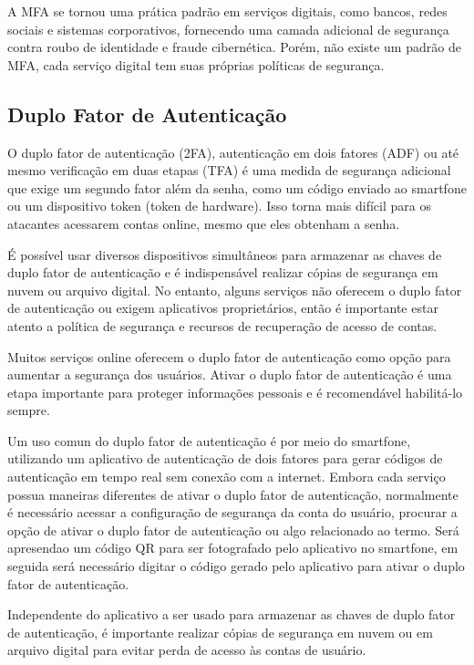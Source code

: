 \documentclass[12pt]{article}
\begin{document}
A MFA se tornou uma prática padrão em serviços digitais, como bancos,
redes sociais e sistemas corporativos, fornecendo uma camada adicional
de segurança contra roubo de identidade e fraude cibernética.
Porém, não existe um padrão de MFA, cada serviço digital tem suas
próprias políticas de segurança.

\subsection{Duplo Fator de Autenticação}

O duplo fator de autenticação (2FA), autenticação em dois fatores (ADF) ou
até mesmo verificação em duas etapas (TFA) é uma medida de segurança
adicional que exige um segundo fator além da senha, como um código enviado
ao smartfone ou um dispositivo token (token de hardware).
Isso torna mais difícil para os atacantes acessarem contas online, mesmo
que eles obtenham a senha.

É possível usar diversos dispositivos simultâneos para armazenar as chaves
de duplo fator de autenticação e é indispensável realizar cópias de
segurança em nuvem ou arquivo digital.
No entanto, alguns serviços não oferecem o duplo fator de autenticação ou
exigem aplicativos proprietários, então é importante estar atento a
política de segurança e recursos de recuperação de acesso de contas.

Muitos serviços online oferecem o duplo fator de autenticação como opção
para aumentar a segurança dos usuários.
Ativar o duplo fator de autenticação é uma etapa importante para proteger
informações pessoais e é recomendável habilitá-lo sempre.

Um uso comun do duplo fator de autenticação é por meio do smartfone,
utilizando um aplicativo de autenticação de dois fatores para gerar
códigos de autenticação em tempo real sem conexão com a internet.
Embora cada serviço possua maneiras diferentes de ativar o duplo fator
de autenticação, normalmente é necessário acessar a configuração de
segurança da conta do usuário, procurar a opção de ativar o duplo fator
de autenticação ou algo relacionado ao termo.
Será apresendao um código QR para ser fotografado pelo aplicativo no
smartfone, em seguida será necessário digitar o código gerado pelo
aplicativo para ativar o duplo fator de autenticação.

Independente do aplicativo a ser usado para armazenar as chaves de
duplo fator de autenticação, é importante realizar cópias de segurança
em nuvem ou em arquivo digital para evitar perda de acesso às contas
de usuário.
\end{document}

